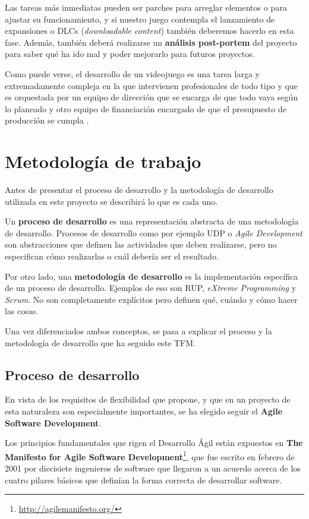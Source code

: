 Las tareas más inmediatas pueden ser parches para arreglar elementos o para ajustar su funcionamiento, y si nuestro juego contempla el lanzamiento de expansiones o DLCs (\textit{downloadable content}) también deberemos hacerlo en esta fase. Además, también deberá realizarse un \textbf{análisis post-portem} del proyecto para saber qué ha ido mal y poder mejorarlo para futuros proyectos.

Como puede verse, el desarrollo de un videojuego es una tarea larga y extremadamente compleja en la que intervienen profesionales de todo tipo y que es orquestada por un equipo de dirección que se encarga de que todo vaya según lo planeado y otro equipo de financiación encargado de que el presupuesto de producción se cumpla \cite{man-14}.

\section{Metodología de trabajo}

Antes de presentar el proceso de desarrollo y la metodología de desarrollo utilizada en este proyecto se describirá lo que es cada uno.

Un \textbf{proceso de desarrollo} es una representación abstracta de una metodología de desarrollo. Procesos de desarrollo como por ejemplo \acs{UDP} o \textit{Agile Development} son abstracciones que definen las actividades que deben realizarse, pero no especifican cómo realizarlas o cuál debería ser el resultado.

Por otro lado, una \textbf{metodología de desarrollo} es la implementación específica de un proceso de desarrollo. Ejemplos de eso son \acs{RUP}, \textit{eXtreme Programming} y \textit{Scrum}. No son completamente explícitos pero definen qué, cuándo y cómo hacer las cosas.

Una vez diferenciados ambos conceptos, se pasa a explicar el proceso y la metodología de desarrollo que ha seguido este \acs{TFM}.

\subsection{Proceso de desarrollo}

En vista de los requisitos de flexibilidad que propone, y que en un proyecto de esta naturaleza son especialmente importantes, se ha elegido seguir el \textbf{Agile Software Development}.

Los principios fundamentales que rigen el Desarrollo Ágil están expuestos en \textbf{The Manifesto for Agile Software Development}\footnote{\url{http://agilemanifesto.org/}}, que fue escrito en febrero de 2001 por diecisiete ingenieros de software que llegaron a un acuerdo acerca de los cuatro pilares básicos que definían la forma correcta de desarrollar software.

